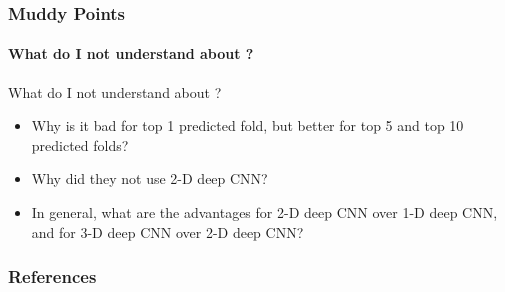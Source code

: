 \documentclass[xcolor={usenames,dvipsnames},hyperref={hyperindex,bookmarks}]{beamer}
\begin{document}









\frame
{
	\frametitle{Muddy Points}
	\framesubtitle{What do I not understand about \cite{Hou2018}?}

	What do I not understand about \cite{Hou2018}?
	\begin{itemize}
	\item Why is it bad for top 1 predicted fold, but better for top 5 and top 10 predicted folds?
	\item Why did they not use 2-D deep CNN?
	\item In general, what are the advantages for 2-D deep CNN over 1-D deep CNN, and for 3-D deep CNN over 2-D deep CNN?
	\end{itemize}

}















\frame
{
	\frametitle{References}



	{\linespread{1}
	
	
	}
}
\end{document}
